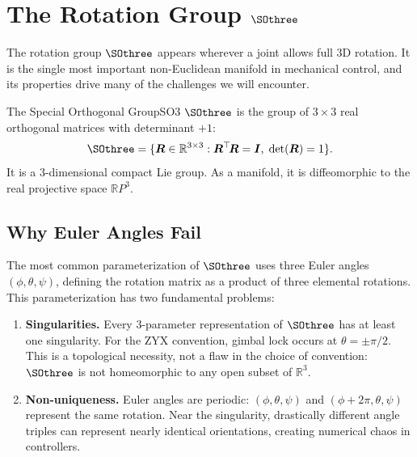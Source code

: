 \documentclass[12pt, openany]{book}
\theoremstyle{plain}
\newcommand{\Reals}{\mathbb{R}}
\begin{document}
\section{The Rotation Group $\SOthree$}

The rotation group $\SOthree$ appears wherever a joint allows full 3D rotation.
It is the single most important non-Euclidean manifold in mechanical control,
and its properties drive many of the challenges we will encounter.

\begin{definition}{The Special Orthogonal Group}{SO3}
  $\SOthree$ is the group of $3 \times 3$ real orthogonal matrices with
  determinant $+1$:
  \begin{equation}
    \SOthree = \{\bm{R} \in \Reals^{3 \times 3} :
    \bm{R}^\top\!\bm{R} = \bm{I},\; \det(\bm{R}) = 1\}.
  \end{equation}
  It is a 3-dimensional compact Lie group. As a manifold, it is diffeomorphic
  to the real projective space $\Reals P^3$.
\end{definition}

\subsection{Why Euler Angles Fail}

The most common parameterization of $\SOthree$ uses three Euler angles
$(\phi, \theta, \psi)$, defining the rotation matrix as a product of three
elemental rotations. This parameterization has two fundamental problems:

\begin{enumerate}[label=\textbf{P\arabic*.}, leftmargin=1.5cm]
  \item \textbf{Singularities.} Every 3-parameter representation of $\SOthree$
    has at least one singularity. For the ZYX convention, gimbal lock occurs
    at $\theta = \pm\pi/2$. This is a topological necessity, not a flaw
    in the choice of convention: $\SOthree$ is not homeomorphic to any open
    subset of $\Reals^3$.

  \item \textbf{Non-uniqueness.} Euler angles are periodic: $(\phi, \theta, \psi)$
    and $(\phi + 2\pi, \theta, \psi)$ represent the same rotation. Near the
    singularity, drastically different angle triples can represent nearly
    identical orientations, creating numerical chaos in controllers.
\end{enumerate}
\end{document}
